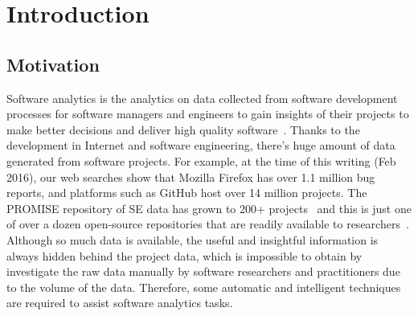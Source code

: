 \section{Introduction}

\subsection{Motivation}

 Software analytics is the analytics on data collected from software development
 processes for software managers and engineers to gain insights of their projects
 to make better decisions and deliver high quality software~\cite{menzies2013software}.
 Thanks to the development in Internet and software engineering, there's huge amount
 of data generated from software projects. For example, at the time of this writing (Feb 2016),
 our web searches show that Mozilla Firefox has over 1.1 million bug reports, and
 platforms such as GitHub host over 14 million projects. The PROMISE repository
 of SE data has grown to 200+ projects~\cite{promise15} and this is just one of
 over a dozen open-source repositories that are readily available to researchers~\cite{rod12}.
 Although so much data is available, the useful and insightful information is always 
 hidden behind the project data, which is impossible to obtain by investigate the raw data manually by software
 researchers and practitioners due to the volume of the data. Therefore, some
 automatic and intelligent techniques are required to assist software analytics tasks.
 

